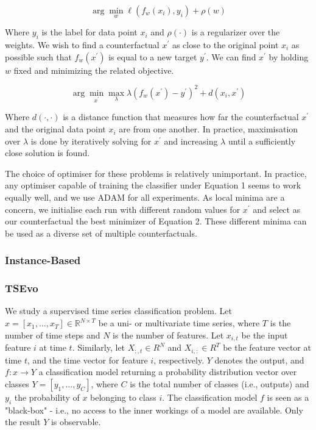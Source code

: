 \begin{equation} \label{eq:1}
\arg \min _{w} \ell\left(f_{w}\left(x_{i}\right), y_{i}\right)+\rho(w)
\end{equation}

Where $y_{i}$ is the label for data point $x_{i}$ and $\rho(\cdot)$ is a regularizer over the weights. We wish to find a counterfactual $x^{\prime}$ as close to the original point $x_{i}$ as possible such that $f_{w}\left(x^{\prime}\right)$ is equal to a new target $y^{\prime}$. We can find $x^{\prime}$ by holding $w$ fixed and minimizing the related objective.


\begin{equation} \label{eq:2}
\arg \min _{x^{\prime}} \max _{\lambda} \lambda\left(f_{w}\left(x^{\prime}\right)-y^{\prime}\right)^{2}+d\left(x_{i}, x^{\prime}\right)
\end{equation}

Where $d(\cdot, \cdot)$ is a distance function that measures how far the counterfactual $x^{\prime}$ and the original data point $x_{i}$ are from one another. In practice, maximisation over $\lambda$ is done by iteratively solving for $x^{\prime}$ and increasing $\lambda$ until a sufficiently close solution is found.

The choice of optimiser for these problems is relatively unimportant. In practice, any optimiser capable of training the classifier under Equation 1 seems to work equally well, and we use $\mathrm{ADAM}$ \cite{kingma_adam_2017} for all experiments.
As local minima are a concern, we initialise each run with different random values for $x^{\prime}$ and select as our counterfactual the best minimizer of Equation 2. These different minima can be used as a diverse set of multiple counterfactuals.
\subsubsection{Instance-Based}


\subsubsection{TSEvo}
We study a supervised time series classification problem. Let $x=\left[x_{1}, \ldots, x_{T}\right] \in \mathbb{R}^{N \times T}$ be a uni- or multivariate time series, where $T$ is the number of time steps and $N$ is the number of features. Let $x_{i, t}$ be the input feature $i$ at time $t$. Similarly, let $X_{:, t} \in R^{N}$ and $X_{i,:} \in R^{T}$ be the feature vector at time $t$, and the time vector for feature $i$, respectively. $Y$ denotes the output, and $f: x \rightarrow Y$ a classification model returning a probability distribution vector over classes $Y=\left[y_{1}, \ldots, y_{C}\right]$, where $C$ is the total number of classes (i.e., outputs) and $y_{i}$ the probability of $x$ belonging to class $i$. The classification model $f$ is seen as a "black-box" - i.e., no access to the inner workings of a model are available. Only the result $Y$ is observable.

